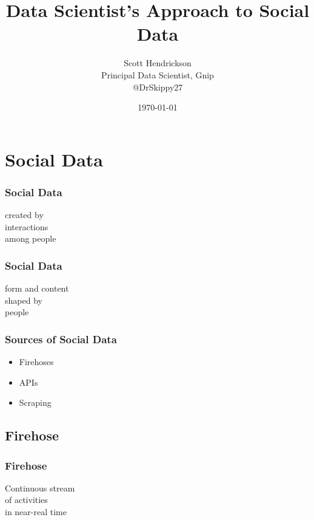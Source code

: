 \documentclass{beamer}
\begin{document}
\title{Data Scientist's Approach to Social Data}
\author{Scott Hendrickson \\ Principal Data Scientist, Gnip \\  @DrSkippy27}
\date{\today} 


\begin{frame}
\titlepage
\end{frame}

\section{Social Data}

\begin{frame}\frametitle{Social Data}
\begin{center}
{\Huge created by \\ [8pt] interactions \\ [15pt] among people}
\end{center}
\end{frame}

\begin{frame}\frametitle{Social Data}
\begin{center}
{\Huge form and content \\ [8pt] shaped by \\ [15pt] people}
\end{center}
\end{frame}

\begin{frame}\frametitle{Sources of Social Data}
{\Huge
\begin{itemize}
\item Firehoses
\item APIs
\item Scraping
\end{itemize}
}
\end{frame}


\subsection{Firehose}

\begin{frame}\frametitle{Firehose}
\begin{center}
{\Huge Continuous stream \\ [8pt] of activities \\ [15pt] in near-real time}
\end{center}
\end{frame}
\end{document}
